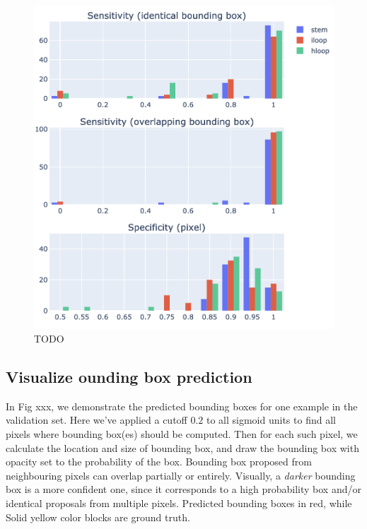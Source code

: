 \documentclass[12pt]{article}
\begin{document}
\begin{figure}[h]
    \centering
    \includegraphics[width=\textwidth]{plot/performance_metrics.png}
    \caption{TODO}
    \label{fig:performance_metrics}
    \centering
\end{figure}






\subsection{Visualize ounding box prediction}

In Fig xxx, we demonstrate the predicted bounding boxes for one example in the validation set.
Here we've applied a cutoff $0.2$ to all sigmoid units to find all pixels where bounding box(es) should be computed.
Then for each such pixel, we calculate the location and size of bounding box,
and draw the bounding box with opacity set to the probability of the box.
Bounding box proposed from neighbouring pixels can overlap partially or entirely.
Visually, a \textit{darker} bounding box is a more confident one,
since it corresponds to a high probability box and/or identical proposals from multiple pixels.
Predicted bounding boxes in red, while Solid yellow color blocks are ground truth.
\end{document}

